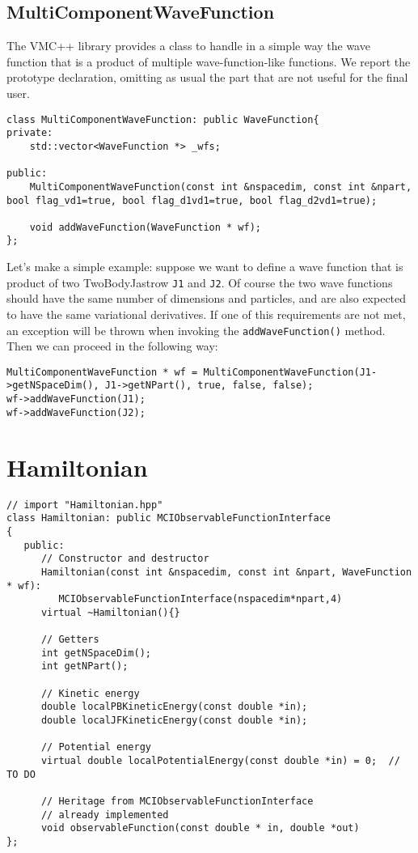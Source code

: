 \documentclass[11pt,a4paper,twoside]{article}
\begin{document}
\subsection{MultiComponentWaveFunction}
\label{sub:multicomponentwavefunction}

The VMC++ library provides a class to handle in a simple way the wave function that is a product of multiple wave-function-like functions.
We report the prototype declaration, omitting as usual the part that are not useful for the final user.

\begin{lstlisting}
class MultiComponentWaveFunction: public WaveFunction{
private:
    std::vector<WaveFunction *> _wfs;

public:
    MultiComponentWaveFunction(const int &nspacedim, const int &npart, bool flag_vd1=true, bool flag_d1vd1=true, bool flag_d2vd1=true);

    void addWaveFunction(WaveFunction * wf);
};
\end{lstlisting}

Let's make a simple example: suppose we want to define a wave function that is product of two TwoBodyJastrow \verb+J1+ and \verb+J2+.
Of course the two wave functions should have the same number of dimensions and particles, and are also expected to have the same variational derivatives.
If one of this requirements are not met, an exception will be thrown when invoking the \verb+addWaveFunction()+ method.
Then we can proceed in the following way:

\begin{lstlisting}
MultiComponentWaveFunction * wf = MultiComponentWaveFunction(J1->getNSpaceDim(), J1->getNPart(), true, false, false);
wf->addWaveFunction(J1);
wf->addWaveFunction(J2);
\end{lstlisting}






\section{Hamiltonian} %
\label{sec:hamiltonian}

\begin{lstlisting}
// import "Hamiltonian.hpp"
class Hamiltonian: public MCIObservableFunctionInterface
{
   public:
      // Constructor and destructor
      Hamiltonian(const int &nspacedim, const int &npart, WaveFunction * wf):
         MCIObservableFunctionInterface(nspacedim*npart,4)
      virtual ~Hamiltonian(){}

      // Getters
      int getNSpaceDim();
      int getNPart();

      // Kinetic energy
      double localPBKineticEnergy(const double *in);
      double localJFKineticEnergy(const double *in);

      // Potential energy
      virtual double localPotentialEnergy(const double *in) = 0;  // TO DO

      // Heritage from MCIObservableFunctionInterface
      // already implemented
      void observableFunction(const double * in, double *out)
};
\end{lstlisting}
\end{document}
